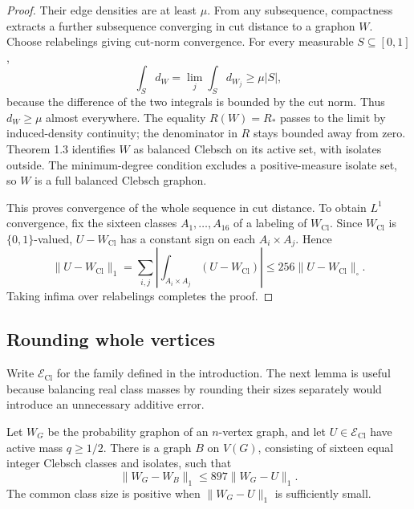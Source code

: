 \begin{proof}
Their edge densities are at least $\mu$. From any subsequence, compactness
extracts a further subsequence converging in cut distance to a graphon $W$.
Choose relabelings giving cut-norm convergence. For every measurable
$S\subseteq[0,1]$,
\[
 \int_S d_W=\lim_j\int_S d_{W_j}\geq\mu|S|,
\]
because the difference of the two integrals is bounded by the cut norm.
Thus $d_W\geq\mu$ almost everywhere. The equality $R(W)=R_\ast$ passes to
the limit by induced-density continuity; the denominator in $R$ stays
bounded away from zero. Theorem 1.3 identifies $W$ as balanced Clebsch on
its active set, with isolates outside. The minimum-degree condition
excludes a positive-measure isolate set, so $W$ is a full balanced Clebsch
graphon.

This proves convergence of the whole sequence in cut distance. To obtain
$L^1$ convergence, fix the sixteen classes $A_1,\ldots,A_{16}$ of a labeling
of $W_{\mathrm{Cl}}$. Since $W_{\mathrm{Cl}}$ is $\{0,1\}$-valued,
$U-W_{\mathrm{Cl}}$ has a constant sign on each $A_i\times A_j$. Hence
\[
 \|U-W_{\mathrm{Cl}}\|_1
 =\sum_{i,j}\left|\int_{A_i\times A_j}(U-W_{\mathrm{Cl}})\right|
 \leq256\|U-W_{\mathrm{Cl}}\|_\square.
\]
Taking infima over relabelings completes the proof.
\end{proof}

\subsection{Rounding whole vertices}
Write $\mathcal E_{\mathrm{Cl}}$ for the family defined in the introduction.
The next lemma is useful because balancing real class masses by rounding
their sizes separately would introduce an unnecessary additive error.

\begin{lemma}\label{lem:integral-rounding}
Let $W_G$ be the probability graphon of an $n$-vertex graph, and let
$U\in\mathcal E_{\mathrm{Cl}}$ have active mass $q\geq1/2$. There is a graph
$B$ on $V(G)$, consisting of sixteen equal integer Clebsch classes and
isolates, such that
\[
 \|W_G-W_B\|_1\leq897\|W_G-U\|_1.
\]
The common class size is positive when $\|W_G-U\|_1$ is sufficiently small.
\end{lemma}

